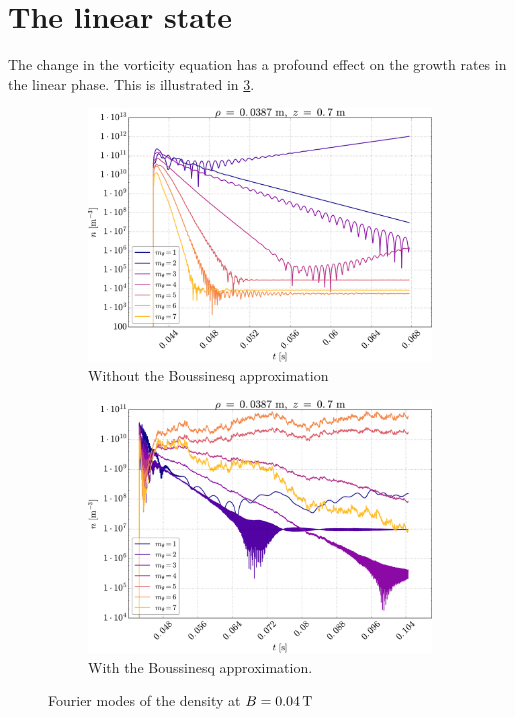 \section{The linear state}
%
The change in the vorticity equation has a profound effect on the growth rates in the linear phase.
This is illustrated in \cref{fig:compFFTB}.
%
\begin{figure}[h!]
    \centering
    \begin{subfigure}[h]{0.45\textwidth}
        \centering
        \includegraphics[width=1.0\textwidth]{fig/results/compareBouss/FFT004}
        \caption{Without the Boussinesq approximation}
        \label{fig:FFTWOB}
    \end{subfigure}%
    \hfill
    \begin{subfigure}[h]{0.45\textwidth}
        \centering
        \includegraphics[width=1.0\textwidth]{fig/results/compareBouss/FFT004B}
        \caption{With the Boussinesq approximation.}
        \label{fig:FFTWB}
    \end{subfigure}
    \caption{Fourier modes of the density at $B=0.04\, \text{T}$}
    \label{fig:compFFTB}
\end{figure}
